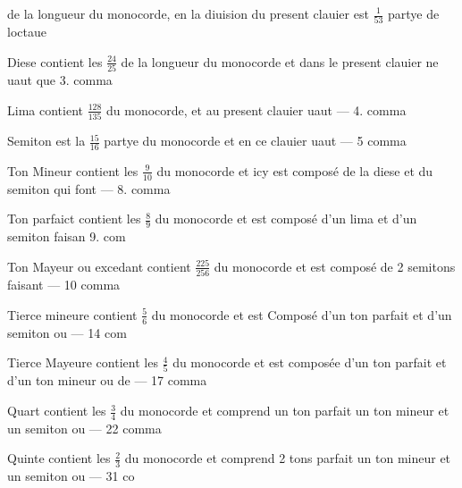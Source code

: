\documentclass[11pt,a4paper]{article}
\begin{document}


\ill{} de la longueur du monocorde, en la diuision du present clauier est $\frac{1}{53}$ partye de loctaue

Diese contient les $\frac{24}{25}$ de la longueur du monocorde et dans le present clauier ne uaut que 3. comma

Lima contient $\frac{128}{135}$ du monocorde, et au present clauier uaut --- 4. comma

Semiton est la $\frac{15}{16}$ partye du monocorde et en ce clauier uaut --- 5 comma

Ton Mineur contient les $\frac{9}{10}$ du monocorde et icy est composé de la diese et du semiton qui font --- 8. comma

Ton parfaict contient les $\frac{8}{9}$ du monocorde et est composé d'un lima et d'un semiton faisan 9. com

Ton Mayeur ou excedant contient $\frac{225}{256}$ du monocorde et est composé de 2 semitons faisant --- 10 comma

Tierce mineure contient $\frac{5}{6}$ du monocorde et est Composé d'un ton parfait et d'un semiton ou --- 14 com

Tierce Mayeure contient les $\frac{4}{5}$ du monocorde et est composée d'un ton parfait et d'un ton mineur ou de --- 17 comma

Quart contient les $\frac{3}{4}$ du monocorde et comprend un ton parfait un ton mineur et un semiton ou --- 22 comma

Quinte contient les $\frac{2}{3}$ du monocorde et comprend 2 tons parfait un ton mineur et un semiton ou --- 31 co
\end{document}
